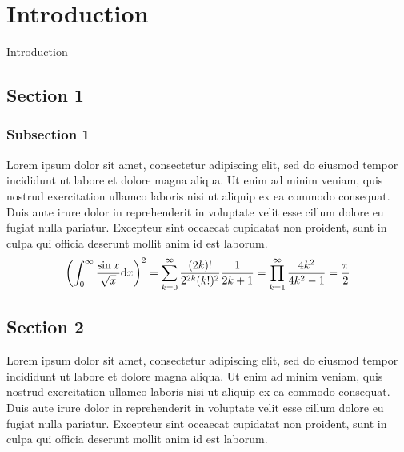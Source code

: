 \chapter{Introduction}
Introduction

\section{Section 1}
\subsection{Subsection 1}
Lorem ipsum dolor sit amet, consectetur adipiscing elit,
sed do eiusmod tempor incididunt ut labore et dolore magna aliqua.
Ut enim ad minim veniam,
quis nostrud exercitation ullamco laboris nisi ut aliquip ex ea commodo consequat.
Duis aute irure dolor in reprehenderit in voluptate velit esse cillum dolore eu fugiat nulla pariatur.
Excepteur sint occaecat cupidatat non proident,
sunt in culpa qui officia deserunt mollit anim id est laborum\cite{PaperSample1}.
\begin{equation}
\qty( \int_{0}^{\infty} \frac{\sin x}{\sqrt{x}} \dd x )^2
    =
    \sum_{ k = 0 }^{ \infty }
        \frac{ (2k)! }{ 2^{2k} (k!)^2 } \frac{1}{ 2k+1 }
    =
    \prod_{ k = 1 }^{ \infty }
        \frac{ 4k^2 }{ 4k^2 - 1 }
    = \frac{ \pi }{ 2 }
\end{equation}


\clearpage


\section{Section 2}
Lorem ipsum dolor sit amet, consectetur adipiscing elit,
sed do eiusmod tempor incididunt ut labore et dolore magna aliqua.
Ut enim ad minim veniam,
quis nostrud exercitation ullamco laboris nisi ut aliquip ex ea commodo consequat.
Duis aute irure dolor in reprehenderit in voluptate velit esse cillum dolore eu fugiat nulla pariatur.
Excepteur sint occaecat cupidatat non proident,
sunt in culpa qui officia deserunt mollit anim id est laborum\cites{PaperSample1,PaperSample2,PaperSample3}.

